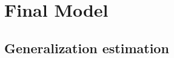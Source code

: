 
\section{Final Model}%
\label{sec:final-model}

\subsection{Generalization estimation}
\label{sub:generalization-estimation}
